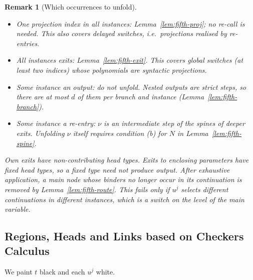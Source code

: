 \documentclass[10pt,a4paper]{article}
\theoremstyle{plain}%
\newtheorem{remark}[theorem]{Remark}
\begin{document}
\begin{remark}[Which occurrences to unfold]
\leavevmode
\begin{itemize}
\item \emph{One projection index in all instances:} Lemma~\ref{lem:fifth-proj}; no re-call is needed.
This also covers delayed switches, i.e.\ projections realised by re-entries.
\item \emph{All instances exits:} Lemma~\ref{lem:fifth-exit}.
This covers global switches (at least two indices) whose polynomials are syntactic projections.
\item \emph{Some instance an output:} do not unfold.
Nested outputs are strict steps, so there are at most $d$ of them per branch and instance (Lemma~\ref{lem:fifth-branch}).
\item \emph{Some instance a re-entry:} $\nu$ is an intermediate step of the spines of deeper exits.
Unfolding $\nu$ itself requires condition (b) for $N$ in Lemma~\ref{lem:fifth-spine}.
\end{itemize}
Own exits have non-contributing head types.
Exits to enclosing parameters have fixed head types, so a fixed type need not produce output.
After exhaustive application, a main node whose binders no longer occur in its continuation is removed by Lemma~\ref{lem:fifth-route}.
This fails only if $u^j$ selects different continuations in different instances, which is a switch on the level of the main variable.
\end{remark}

\newpage

\subsection{Regions, Heads and Links based on Checkers Calculus}
\label{sec:fifth-regions}

We paint $t$ black and each $u^j$ white.
\end{document}
